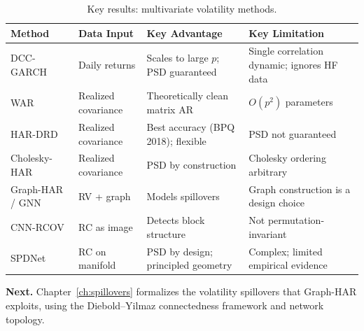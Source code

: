 \begin{table}[ht]
\centering
\caption{Key results: multivariate volatility methods.}
\label{tab:multivariate-summary}
\begin{tabular}{p{3.2cm} p{3cm} p{3cm} p{3cm}}
\toprule
\textbf{Method} & \textbf{Data Input} & \textbf{Key Advantage} & \textbf{Key Limitation} \\
\midrule
DCC-GARCH & Daily returns & Scales to large $p$; PSD guaranteed & Single correlation dynamic; ignores HF data \\
WAR & Realized covariance & Theoretically clean matrix AR & $O(p^2)$ parameters \\
HAR-DRD & Realized covariance & Best accuracy (BPQ 2018); flexible & PSD not guaranteed \\
Cholesky-HAR & Realized covariance & PSD by construction & Cholesky ordering arbitrary \\
Graph-HAR / GNN & RV + graph & Models spillovers & Graph construction is a design choice \\
CNN-RCOV & RC as image & Detects block structure & Not permutation-invariant \\
SPDNet & RC on manifold & PSD by design; principled geometry & Complex; limited empirical evidence \\
\bottomrule
\end{tabular}
\end{table}

\bigskip
\noindent\textbf{Next.}  Chapter~\ref{ch:spillovers} formalizes the volatility
spillovers that Graph-HAR exploits, using the Diebold--Yilmaz connectedness
framework and network topology.

